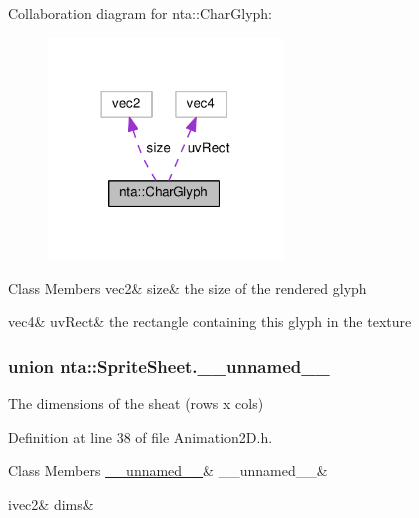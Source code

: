 Collaboration diagram for nta\+:\+:Char\+Glyph\+:\nopagebreak
\begin{figure}[H]
\begin{center}
\leavevmode
\includegraphics[width=177pt]{df/ddc/structnta_1_1CharGlyph__coll__graph}
\end{center}
\end{figure}
\begin{DoxyFields}{Class Members}
\mbox{\label{namespacenta_aa2a40e6fe48ffadb4c7c95af7e82db91}} 
vec2&
size&
the size of the rendered glyph \\
\hline

\mbox{\label{namespacenta_a46d9ea9c38c8bf5e1c1679e938019f53}} 
vec4&
uvRect&
the rectangle containing this glyph in the texture \\
\hline

\end{DoxyFields}
\label{unionnta_1_1SpriteSheet_8____unnamed____}
\subsubsection{union nta\+:\+:Sprite\+Sheet.\+\_\+\+\_\+unnamed\+\_\+\+\_\+}
The dimensions of the sheat (rows x cols) 

Definition at line 38 of file Animation2\+D.\+h.

\begin{DoxyFields}{Class Members}
\mbox{\label{namespacenta_a1378d7d8767899287b0407055215aa4e}} 
\hyperlink{namespacenta_df/d10/structnta_1_1SpriteSheet_8____unnamed_____8____unnamed____}{\_\_unnamed\_\_}&
\_\_unnamed\_\_&
\\
\hline

\mbox{\label{namespacenta_a5927205243f12cdc70612cba6dc874fa}} 
ivec2&
dims&
\\
\hline

\end{DoxyFields}
\label{structnta_1_1SpriteSheet_8____unnamed_____8____unnamed____}
